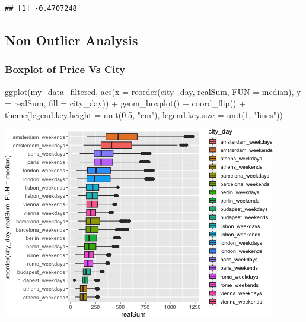 \documentclass[
]{article}
\newenvironment{Shaded}{\begin{snugshade}}{\end{snugshade}}
\newcommand{\AttributeTok}[1]{\textcolor[rgb]{0.77,0.63,0.00}{#1}}
\newcommand{\DecValTok}[1]{\textcolor[rgb]{0.00,0.00,0.81}{#1}}
\newcommand{\FloatTok}[1]{\textcolor[rgb]{0.00,0.00,0.81}{#1}}
\newcommand{\FunctionTok}[1]{\textcolor[rgb]{0.00,0.00,0.00}{#1}}
\newcommand{\NormalTok}[1]{#1}
\newcommand{\SpecialCharTok}[1]{\textcolor[rgb]{0.00,0.00,0.00}{#1}}
\newcommand{\StringTok}[1]{\textcolor[rgb]{0.31,0.60,0.02}{#1}}
\begin{document}
\begin{verbatim}
## [1] -0.4707248
\end{verbatim}

\hypertarget{non-outlier-analysis}{%
\subsection{Non Outlier Analysis}\label{non-outlier-analysis}}

\hypertarget{boxplot-of-price-vs-city}{%
\subsubsection{Boxplot of Price Vs
City}\label{boxplot-of-price-vs-city}}

\begin{Shaded}
\begin{Highlighting}[]
\FunctionTok{ggplot}\NormalTok{(my\_data\_filtered, }\FunctionTok{aes}\NormalTok{(}\AttributeTok{x =} \FunctionTok{reorder}\NormalTok{(city\_day, realSum, }\AttributeTok{FUN =}\NormalTok{ median),}
    \AttributeTok{y =}\NormalTok{ realSum, }\AttributeTok{fill =}\NormalTok{ city\_day)) }\SpecialCharTok{+} \FunctionTok{geom\_boxplot}\NormalTok{() }\SpecialCharTok{+} \FunctionTok{coord\_flip}\NormalTok{() }\SpecialCharTok{+}
    \FunctionTok{theme}\NormalTok{(}\AttributeTok{legend.key.height =} \FunctionTok{unit}\NormalTok{(}\FloatTok{0.5}\NormalTok{, }\StringTok{"cm"}\NormalTok{), }\AttributeTok{legend.key.size =} \FunctionTok{unit}\NormalTok{(}\DecValTok{1}\NormalTok{,}
        \StringTok{"lines"}\NormalTok{))}
\end{Highlighting}
\end{Shaded}

\includegraphics{Project_files/figure-latex/unnamed-chunk-28-1.png}
\end{document}
